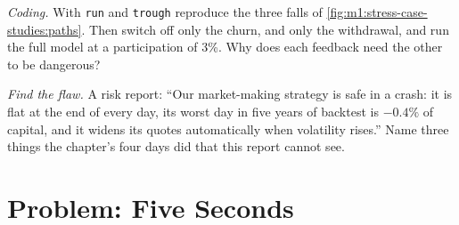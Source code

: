 \begin{exercise}[$\star\star\star$]\label{exo:m1:stress-case-studies:7}
\emph{Coding.} With \texttt{run} and \texttt{trough} reproduce the three
falls of \cref{fig:m1:stress-case-studies:paths}. Then switch off only the
churn, and only the withdrawal, and run the full model at a participation of
3\%. Why does each feedback need the other to be dangerous?
\end{exercise}

\begin{exercise}[$\star\star\star$]\label{exo:m1:stress-case-studies:8}
\emph{Find the flaw.} A risk report: ``Our market-making strategy is safe in a
crash: it is flat at the end of every day, its worst day in five years of
backtest is $-0.4\%$ of capital, and it widens its quotes automatically when
volatility rises.'' Name three things the chapter's four days did that this
report cannot see.
\end{exercise}

\section{Problem: Five Seconds}

